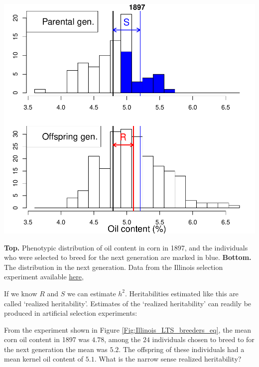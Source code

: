 \begin{marginfigure}
\begin{center}
\includegraphics[width=\textwidth]{Journal_figs/Quant_gen/Illinois_long_term_selection_corn/Illinois_LTS_breeders_eq.pdf}
\end{center}
\caption{{\bf Top.} Phenotypic distribution of oil content in corn in
  1897, and the individuals who were selected to breed for the next
  generation are marked in blue.   {\bf Bottom.} The distribution in the next generation. Data from the
  Illinois selection experiment available \href{https://www.ideals.illinois.edu/handle/2142/3525}{here}, }  \label{Fig:Illinois_LTS_breeders_eq}
\end{marginfigure}

If we know $R$ and $S$ we can estimate $h^2$. Heritabilities estimated
like this are called `realized heritability'. Estimates of the
`realized heritability' can readily be produced in artificial selection experiments:
\begin{question}
  From the experiment shown in Figure \ref{Fig:Illinois_LTS_breeders_eq},
  the mean corn oil content in 1897 was $4.78$, among the $24$ individuals
chosen to breed to for the next generation the mean was $5.2$. The
offspring of these individuals had a mean kernel oil content of
$5.1$. What is the narrow sense realized heritability? 
\end{question}

